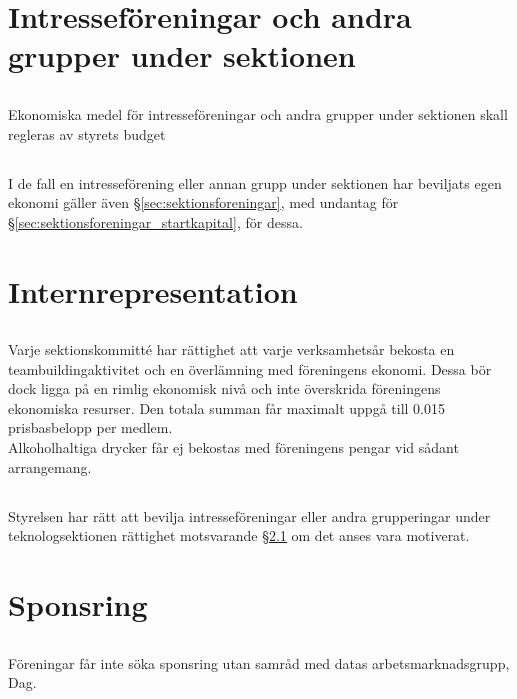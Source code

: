 \documentclass{dtek}
\begin{document}
\section{Intresseföreningar och andra grupper under sektionen}
\subsection{}
Ekonomiska medel för intresseföreningar och andra grupper under sektionen skall regleras av styrets budget
\subsection{}
I de fall en intresseförening eller annan grupp under sektionen har beviljats egen ekonomi gäller även §\ref{sec:sektionsforeningar}, med undantag för §\ref{sec:sektionsforeningar_startkapital}, för dessa.

\section{Internrepresentation}
\subsection{}
\label{sec:internreps}
Varje sektionskommitté har rättighet att varje verksamhetsår bekosta en teambuildingaktivitet och en överlämning med föreningens ekonomi. Dessa bör dock ligga på en rimlig ekonomisk nivå och inte överskrida föreningens ekonomiska resurser. Den totala summan får maximalt uppgå till 0.015 prisbasbelopp per medlem.\\
Alkoholhaltiga drycker får ej bekostas med föreningens pengar vid sådant arrangemang.
\subsection{}
Styrelsen har rätt att bevilja intresseföreningar eller andra grupperingar under teknologsektionen rättighet motsvarande §\ref{sec:internreps} om det anses vara motiverat.

\section{Sponsring}
\subsection{}
Föreningar får inte söka sponsring utan samråd med datas
arbetsmarknadsgrupp, Dag.
\end{document}
